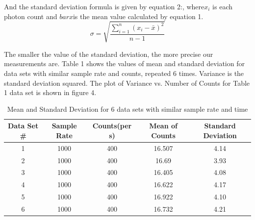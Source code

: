 \documentclass[letterpaper,12pt]{article}
\begin{document}
And the standard deviation formula is given by equation 2:, where\begin{math} x_i \end{math} is each photon count and \begin{math} bar{x} \end{math}is the mean value calculated by equation 1. 
\begin{equation} \label{E:sd}
\sigma = \sqrt{\frac{\sum\limits_{i=1}^{n}
\left(x_{i} - \bar{x}\right)^{2}}
{n-1}}
\end{equation}

The smaller the value of the standard deviation, the more precise our measurements are. Table 1 shows the values of mean and standard deviation for data sets with similar sample rate and counts, repeated 6 times. Variance is the standard deviation squared. The plot of Variance vs. Number of Counts for Table 1 data set is shown in figure 4.

\begin{table}[ht]
\caption{Mean and Standard Deviation for 6 data sets with similar sample rate and time} %
\centering %
\begin{tabular}{c c c c c} %
\hline\hline %
Data Set \# & Sample Rate & Counts(per s) & Mean of Counts & Standard Deviation \\ [0.5ex] %
\hline %
1 & 1000 & 400 & 16.507 & 4.14\\ %
2 & 1000 & 400& 16.69  & 3.93\\
3 & 1000 & 400& 16.405  & 4.08\\
4 & 1000 & 400 & 16.622 & 4.17\\
5 & 1000 & 400 & 16.922 & 4.10\\ 
6 & 1000 & 400 & 16.732 & 4.21 \\ [1ex] %
\hline %
\end{tabular}
\label{table:nonlin} %
\end{table}
\end{document}
